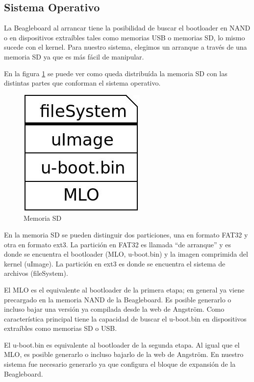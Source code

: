 \subsection{Sistema Operativo}
La Beagleboard al arrancar tiene la posibilidad de buscar el bootloader en NAND o en dispositivos extraíbles tales como memorias USB o memorias SD, lo mismo sucede con el kernel. Para nuestro sistema, elegimos un arranque a través de una memoria SD ya que es más fácil de manipular.

En la figura \ref{Fig:SD} se puede ver como queda distribuída la memoria SD con las distintas partes
que conforman el sistema operativo. 

\begin{figure}[H]
\centering
  \begin{center}
  \includegraphics[scale=.4]{Imagenes/sd.jpg} 
  \end{center}
  \caption{Memoria SD}\label{Fig:SD} 
\end{figure}

En la memoria SD se pueden distinguir dos particiones, una en formato FAT32 y otra
en formato ext3. La partición en FAT32 es llamada “de arranque” y es donde se encuentra 
el bootloader (MLO, u-boot.bin) y la imagen comprimida del kernel (uImage). 
La partición en ext3 es donde se encuentra el sistema de archivos (fileSystem).

El MLO es el equivalente al bootloader de la primera etapa; en general ya viene precargado en la memoria NAND de la Beagleboard. Es posible generarlo o incluso bajar una versión ya compilada desde la web de Angström. Como característica principal tiene la capacidad de buscar el u-boot.bin en dispositivos extraíbles como memorias SD o USB.

El u-boot.bin es equivalente al bootloader de la segunda etapa. Al igual que el MLO, es posible generarlo o incluso bajarlo de la web de Angström. En nuestro sistema fue necesario generarlo ya que configura el bloque de expansión de la Beagleboard.

